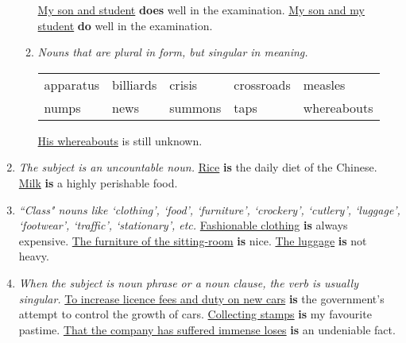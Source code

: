 \begin{enumerate}
\begin{enumerate}
                \underline{My son and student} \textbf{does} well in the examination.
                \newline
                \underline{My son and my student} \textbf{do} well in the
                examination.
            \item {\it Nouns that are plural in form, but singular in meaning.}
                \newline
                \begin{tabular}{lllll}
                    apparatus & billiards & crisis & crossroads & measles \\
                    numps & news & summons & taps & whereabouts
                \end{tabular}
                \newline
                \newline
                \underline{His whereabouts} is still unknown.
        \end{enumerate}
    \item
        {\it
        The subject is an uncountable noun.
        }
        \newline
        \newline
        \underline{Rice} \textbf{is} the daily diet of the Chinese.
        \newline
        \newline
        \underline{Milk} \textbf{is} a highly perishable food.
    \item
        {\it ``Class" nouns like `clothing', `food', `furniture', `crockery',
        `cutlery', `luggage', `footwear', `traffic', `stationary', etc.
        }
        \newline
        \newline
        \underline{Fashionable clothing} \textbf{is} always expensive.
        \newline
        \newline
        \underline{The furniture of the sitting-room} \textbf{is} nice.
        \newline
        \newline
        \underline{The luggage} \textbf{is} not heavy.
    \item
        {\it
        When the subject is noun phrase or a noun clause, the verb is usually
        singular.
        }
        \newline
        \newline
        \underline{To increase licence fees and duty on new cars} \textbf{is}
        the government's attempt to control the growth of cars.
        \newline
        \newline
        \underline{Collecting stamps} \textbf{is} my favourite pastime.
        \newline
        \newline
        \underline{That the company has suffered immense loses} \textbf{is} an
        undeniable fact.
\end{enumerate}

